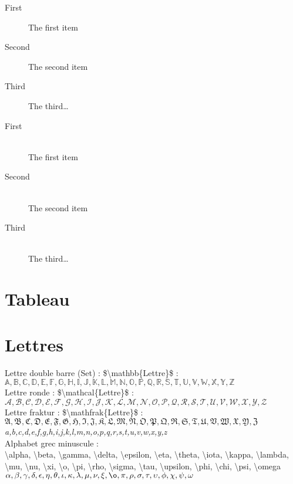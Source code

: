 \documentclass{article}
\begin{document}
\begin{description}
\item[First] The first item
\item[Second] The second item
\item[Third] The third\ldots
\end{description}

\begin{description}
\item[First] \hfill \\
The first item
\item[Second] \hfill \\
The second item
\item[Third] \hfill \\
The third\ldots
\end{description}
\section{Tableau}

\section{Lettres}
Lettre double barre (Set) : \$\textbackslash mathbb\{Lettre\}\$ :\\
$\mathbb{A,B,C,D,E,F,G,H,I,J,K,L,M,N,O,P,Q,R,S,T,U,V,W,X,Y,Z}$\\
Lettre ronde : \$\textbackslash mathcal\{Lettre\}\$ :\\
$\mathcal{A,B,C,D,E,F,G,H,I,J,K,L,M,N,O,P,Q,R,S,T,U,V,W,X,Y,Z}$\\
Lettre fraktur : \$\textbackslash mathfrak\{Lettre\}\$ :\\
$\mathfrak{A,B,C,D,E,F,G,H,I,J,K,L,M,N,O,P,Q,R,S,T,U,V,W,X,Y,Z}$\\
\emph{a,b,c,d,e,f,g,h,i,j,k,l,m,n,o,p,q,r,s,t,u,v,w,x,y,z}\\
Alphabet grec minuscule :\\
\textbackslash alpha, \textbackslash beta, \textbackslash gamma, \textbackslash delta, \textbackslash epsilon, \textbackslash eta, \textbackslash theta, \textbackslash iota, \textbackslash kappa, \textbackslash lambda, \textbackslash mu, \textbackslash nu, \textbackslash xi, \textbackslash o, \textbackslash pi, \textbackslash rho, \textbackslash sigma, \textbackslash tau, \textbackslash upsilon, \textbackslash phi, \textbackslash chi, \textbackslash psi, \textbackslash omega\\
$\alpha, \beta, \gamma, \delta, \epsilon, \eta, \theta, \iota, \kappa, \lambda, \mu, \nu, \xi, \o, \pi, \rho, \sigma, \tau, \upsilon, \phi, \chi, \psi, \omega$\\
\end{document}
